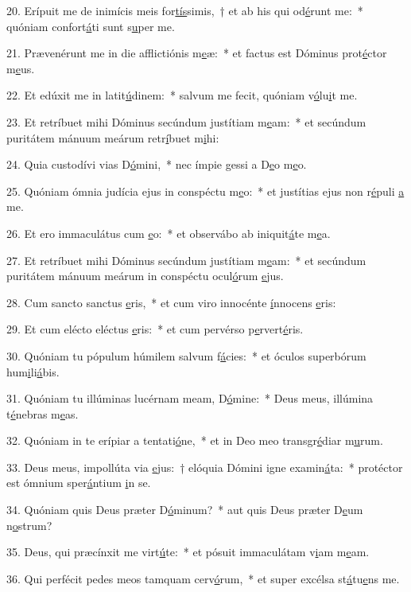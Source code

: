 20. Erípuit me de inimícis meis for\uline{tís}simis,~† et ab his qui od\uline{é}runt me:~* quóniam confort\uline{á}ti sunt s\uline{u}per me.\par 
21. Prævenérunt me in die afflictiónis m\uline{e}æ:~* et factus est Dóminus prot\uline{é}ctor m\uline{e}us.\par 
22. Et edúxit me in latit\uline{ú}dinem:~* salvum me fecit, quóniam v\uline{ó}lu\uline{i}t me.\par 
23. Et retríbuet mihi Dóminus secúndum justítiam m\uline{e}am:~* et secúndum puritátem mánuum meárum retr\uline{í}buet m\uline{i}hi:\par 
24. Quia custodívi vias D\uline{ó}mini,~* nec ímpie gessi a D\uline{e}o m\uline{e}o.\par 
25. Quóniam ómnia judícia ejus in conspéctu m\uline{e}o:~* et justítias ejus non r\uline{é}puli \uline{a} me.\par 
26. Et ero immaculátus cum \uline{e}o:~* et observábo ab iniquit\uline{á}te m\uline{e}a.\par 
27. Et retríbuet mihi Dóminus secúndum justítiam m\uline{e}am:~* et secúndum puritátem mánuum meárum in conspéctu ocul\uline{ó}rum \uline{e}jus.\par 
28. Cum sancto sanctus \uline{e}ris,~* et cum viro innocénte \uline{í}nnocens \uline{e}ris:\par 
29. Et cum elécto eléctus \uline{e}ris:~* et cum pervérso p\uline{e}rvert\uline{é}ris.\par 
30. Quóniam tu pópulum húmilem salvum f\uline{á}cies:~* et óculos superbórum hum\uline{i}li\uline{á}bis.\par 
31. Quóniam tu illúminas lucérnam meam, D\uline{ó}mine:~* Deus meus, illúmina t\uline{é}nebras m\uline{e}as.\par 
32. Quóniam in te erípiar a tentati\uline{ó}ne,~* et in Deo meo transgr\uline{é}diar m\uline{u}rum.\par 
33. Deus meus, impollúta via \uline{e}jus:~† elóquia Dómini igne examin\uline{á}ta:~* protéctor est ómnium sper\uline{á}ntium \uline{i}n se.\par 
34. Quóniam quis Deus præter D\uline{ó}minum?~* aut quis Deus præter D\uline{e}um n\uline{o}strum?\par 
35. Deus, qui præcínxit me virt\uline{ú}te:~* et pósuit immaculátam v\uline{i}am m\uline{e}am.\par 
36. Qui perfécit pedes meos tamquam cerv\uline{ó}rum,~* et super excélsa st\uline{á}tu\uline{e}ns me.\par 
